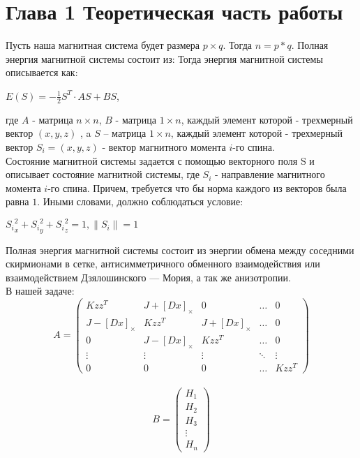 \documentclass[ 12pt,x11names]{article}
\begin{document}
    \newpage
    \section{Глава 1 Теоретическая часть работы}
    Пусть наша магнитная система будет размера $p \times  q$. Тогда $n =  p * q$.
    Полная энергия магнитной системы состоит из:
    Тогда энергия магнитной системы описывается как:
    \begin{center}
    $E(S) = - \frac{1}{2}S^T \cdot AS + BS$,
    \end{center}
    где $A$ - матрица $n \times n$, $B$ - матрица $1 \times n$,
    каждый элемент которой - трехмерный вектор $(x, y, z)$
    , a $S$ -- матрица $1\times n$, каждый элемент которой - трехмерный вектор $S_i = (x, y, z)$ - вектор магнитного момента $i$-го спина. \\
    Состояние магнитной системы задается с помощью векторного поля S и описывает состояние магнитной системы, где $S_i$ - направление магнитного момента $i$-го  спина.
    Причем, требуется что бы норма каждого из векторов была равна $1$. Иными словами, должно соблюдаться условие:\\
     \begin{center}
     ${S_{i}}_x^2 + {S_{i}}_y^2 + {S_{i}}_z^2 = 1, \|S_{i}\| = 1$\\
    \end{center}
    Полная энергия магнитной системы состоит из энергии обмена между соседними скирмионами в сетке,  антисимметричного обменного взаимодействия или взаимодействием Дзялошинского — Мория, а так же анизотропии.\\
    В нашей задаче:
    \begin{equation*}
    A = \left(
    \begin{array}{ccccс}
    Kzz^T & J + [Dx]_\times & 0  & \ldots & 0\\
    J - [Dx]_\times & Kzz^T & J + [Dx]_\times &\ldots & 0\\
    0 & J - [Dx]_\times & Kzz^T &\ldots & 0\\
    \vdots &\vdots &\vdots &\ddots & \vdots\\
    0 & 0 &  0 &\ldots & Kzz^T
    \end{array}
    \right)
    \end{equation*}\\
     \begin{equation*}
    B = \left(
    \begin{array}{c}
    H_1\\
    H_2\\
    H_3\\
    \vdots\\
    H_n
    \end{array}
    \right)
    \end{equation*}\\
\end{document}
